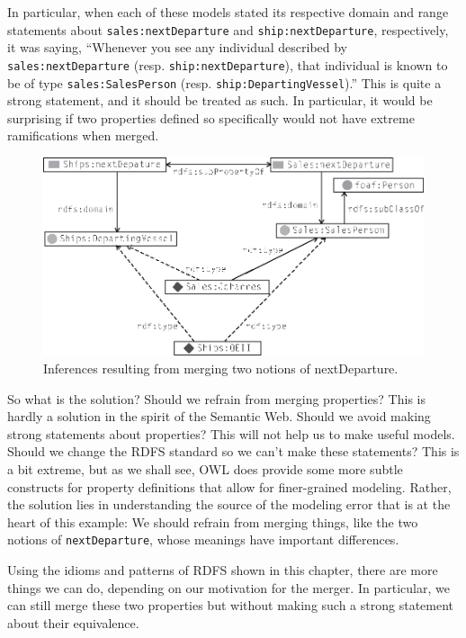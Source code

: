 In particular, when each of these models stated its respective domain
and range statements about \texttt{sales:nextDeparture} and \texttt{ship:nextDeparture},
respectively, it was saying, ``Whenever you see any individual described
by \texttt{sales:nextDeparture} (resp. \texttt{ship:nextDeparture}), that individual is
known to be of type \texttt{sales:SalesPerson} (resp. \texttt{ship:DepartingVessel}).''
This is quite a strong statement, and it should be treated as such. In
particular, it would be surprising if two properties defined so
specifically would not have extreme ramifications when merged.

\begin{figure}
\centering
\includegraphics[width=5in]{media/ch8/f08-6.eps}
\caption{Inferences resulting from merging two notions of nextDeparture.}
\label{fig:ch8.6}
\end{figure}



So what is the solution? Should we refrain from merging properties? This
is hardly a solution in the spirit of the Semantic Web. Should we avoid
making strong statements about properties? This will not help us to make
useful models. Should we change the RDFS standard so we can't make these
statements? This is a bit extreme, but as we shall see, OWL does provide
some more subtle constructs for property definitions that allow for
finer-grained modeling. Rather, the solution lies in understanding the
source of the modeling error that is at the heart of this example: We
should refrain from merging things, like the two notions of
\texttt{nextDeparture}, whose meanings have important differences.

Using the idioms and patterns of RDFS shown in this chapter, there are
more things we can do, depending on our motivation for the merger. In
particular, we can still merge these two properties but without making
such a strong statement about their equivalence.

